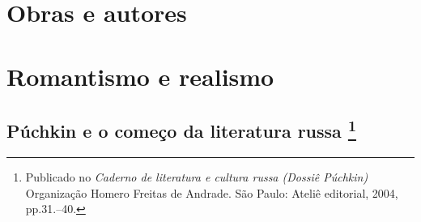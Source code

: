 















\part{Obras e autores}

\part{Romantismo e realismo}

\chapter{Púchkin e o começo da literatura russa \footnote{Publicado no \emph{Caderno de literatura e cultura russa (Dossiê Púchkin)} Organização Homero Freitas de Andrade. São Paulo: Ateliê editorial, 2004, pp.31.--40.}}

